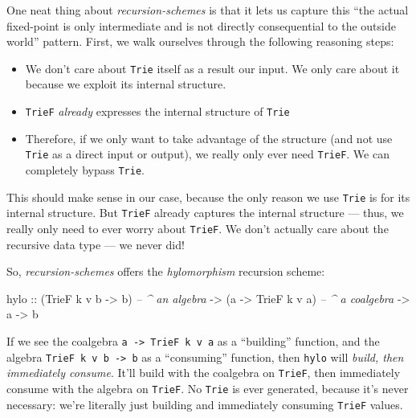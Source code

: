 \documentclass[]{article}
\newenvironment{Shaded}{}{}
\newcommand{\CommentTok}[1]{\textcolor[rgb]{0.38,0.63,0.69}{\textit{#1}}}
\newcommand{\DataTypeTok}[1]{\textcolor[rgb]{0.56,0.13,0.00}{#1}}
\newcommand{\NormalTok}[1]{#1}
\newcommand{\OtherTok}[1]{\textcolor[rgb]{0.00,0.44,0.13}{#1}}
\begin{document}
One neat thing about \emph{recursion-schemes} is that it lets us capture this
``the actual fixed-point is only intermediate and is not directly consequential
to the outside world'' pattern. First, we walk ourselves through the following
reasoning steps:

\begin{itemize}
\tightlist
\item
  We don't care about \texttt{Trie} itself as a result our input. We only care
  about it because we exploit its internal structure.
\item
  \texttt{TrieF} \emph{already} expresses the internal structure of
  \texttt{Trie}
\item
  Therefore, if we only want to take advantage of the structure (and not use
  \texttt{Trie} as a direct input or output), we really only ever need
  \texttt{TrieF}. We can completely bypass \texttt{Trie}.
\end{itemize}

This should make sense in our case, because the only reason we use \texttt{Trie}
is for its internal structure. But \texttt{TrieF} already captures the internal
structure --- thus, we really only need to ever worry about \texttt{TrieF}. We
don't actually care about the recursive data type --- we never did!

So, \emph{recursion-schemes} offers the \emph{hylomorphism} recursion scheme:

\begin{Shaded}
\begin{Highlighting}[]
\NormalTok{hylo}
\OtherTok{    ::}\NormalTok{ (}\DataTypeTok{TrieF}\NormalTok{ k v b }\OtherTok{->}\NormalTok{ b)   }\CommentTok{-- ^ an algebra}
    \OtherTok{->}\NormalTok{ (a }\OtherTok{->} \DataTypeTok{TrieF}\NormalTok{ k v a)   }\CommentTok{-- ^ a coalgebra}
    \OtherTok{->}\NormalTok{ a}
    \OtherTok{->}\NormalTok{ b}
\end{Highlighting}
\end{Shaded}

If we see the coalgebra \texttt{a\ -\textgreater{}\ TrieF\ k\ v\ a} as a
``building'' function, and the algebra
\texttt{TrieF\ k\ v\ b\ -\textgreater{}\ b} as a ``consuming'' function, then
\texttt{hylo} will \emph{build, then immediately consume}. It'll build with the
coalgebra on \texttt{TrieF}, then immediately consume with the algebra on
\texttt{TrieF}. No \texttt{Trie} is ever generated, because it's never
necessary: we're literally just building and immediately consuming
\texttt{TrieF} values.
\end{document}
